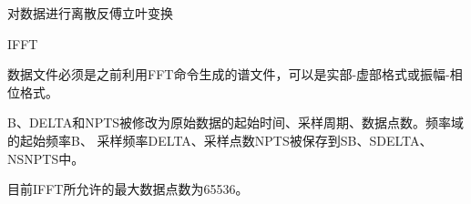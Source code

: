 \label{cmd:ifft}

对数据进行离散反傅立叶变换

\begin{SACSTX}
IFFT
\end{SACSTX}

数据文件必须是之前利用FFT命令生成的谱文件，可以是实部-虚部格式或振幅-相位格式。

B、DELTA和NPTS被修改为原始数据的起始时间、采样周期、数据点数。频率域的起始频率B、
采样频率DELTA、采样点数NPTS被保存到SB、SDELTA、NSNPTS中。

目前IFFT所允许的最大数据点数为65536。

